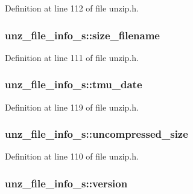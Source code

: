 Definition at line 112 of file unzip.\-h.

\hypertarget{structunz__file__info__s_ae4f2f81a5301f7df9014838a56a496c6}{
\subsubsection[{size\-\_\-filename}]{ unz\-\_\-file\-\_\-info\-\_\-s\-::size\-\_\-filename}}\label{structunz__file__info__s_ae4f2f81a5301f7df9014838a56a496c6}


Definition at line 111 of file unzip.\-h.

\hypertarget{structunz__file__info__s_ad52c08c65349f674b00244d81cdb1736}{
\subsubsection[{tmu\-\_\-date}]{ unz\-\_\-file\-\_\-info\-\_\-s\-::tmu\-\_\-date}}\label{structunz__file__info__s_ad52c08c65349f674b00244d81cdb1736}


Definition at line 119 of file unzip.\-h.

\hypertarget{structunz__file__info__s_a7696a98511bc57e389485e5313a9c2bf}{
\subsubsection[{uncompressed\-\_\-size}]{ unz\-\_\-file\-\_\-info\-\_\-s\-::uncompressed\-\_\-size}}\label{structunz__file__info__s_a7696a98511bc57e389485e5313a9c2bf}


Definition at line 110 of file unzip.\-h.

\hypertarget{structunz__file__info__s_a635f933b26b636d8314cef61af62fcef}{
\subsubsection[{version}]{ unz\-\_\-file\-\_\-info\-\_\-s\-::version}}\label{structunz__file__info__s_a635f933b26b636d8314cef61af62fcef}


